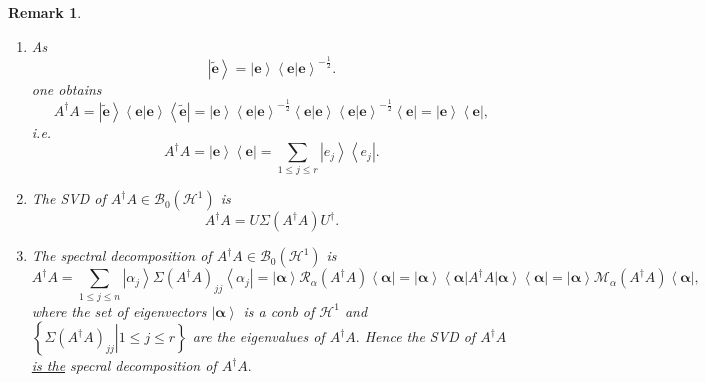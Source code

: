 \documentclass[aps,preprint]{revtex4}%
\newtheorem{remark}[theorem]{Remark}
\begin{document}
\begin{remark}
\begin{enumerate}
\begin{enumerate}
\item As%
\begin{equation}
\left\vert \widetilde{\mathbf{e}}\right\rangle =\left\vert \mathbf{e}%
\right\rangle \left\langle \left.  \mathbf{e}\right\vert \mathbf{e}%
\right\rangle ^{-\frac{1}{2}}.
\end{equation}
one obtains
\begin{equation}
A^{\dagger}A=\left\vert \widetilde{\mathbf{e}}\right\rangle \left\langle
\left.  \mathbf{e}\right\vert \mathbf{e}\right\rangle \left\langle
\widetilde{\mathbf{e}}\right\vert =\left\vert \mathbf{e}\right\rangle
\left\langle \left.  \mathbf{e}\right\vert \mathbf{e}\right\rangle ^{-\frac
{1}{2}}\left\langle \left.  \mathbf{e}\right\vert \mathbf{e}\right\rangle
\left\langle \left.  \mathbf{e}\right\vert \mathbf{e}\right\rangle ^{-\frac
{1}{2}}\left\langle \mathbf{e}\right\vert =\left\vert \mathbf{e}\right\rangle
\left\langle \mathbf{e}\right\vert ,
\end{equation}
i.e.
\begin{equation}
A^{\dagger}A=\left\vert \mathbf{e}\right\rangle \left\langle \mathbf{e}%
\right\vert =\sum_{1\leq j\leq r}\left\vert e_{j}\right\rangle \left\langle
e_{j}\right\vert .
\end{equation}


\item The SVD of $A^{\dagger}A\in\mathcal{B}_{0}\left(  \mathcal{H}%
^{1}\right)  $ is
\begin{equation}
A^{\dagger}A=U\Sigma\left(  A^{\dagger}A\right)  U^{\dagger}.
\end{equation}


\item The \emph{spectral} decomposition of $A^{\dagger}A\in\mathcal{B}%
_{0}\left(  \mathcal{H}^{1}\right)  $ is%
\begin{equation}
A^{\dagger}A=\sum_{1\leq j\leq n}\left\vert \alpha_{j}\right\rangle
\Sigma\left(  A^{\dagger}A\right)  _{jj}\left\langle \alpha_{j}\right\vert
=\left\vert \mathbf{\alpha}\right\rangle \mathcal{R}_{\alpha}\left(
A^{\dagger}A\right)  \left\langle \mathbf{\alpha}\right\vert =\left\vert
\mathbf{\alpha}\right\rangle \left\langle \mathbf{\alpha}\right\vert
A^{\dagger}A\left\vert \mathbf{\alpha}\right\rangle \left\langle
\mathbf{\alpha}\right\vert =\left\vert \mathbf{\alpha}\right\rangle
\mathcal{M}_{\alpha}\left(  A^{\dagger}A\right)  \left\langle \mathbf{\alpha
}\right\vert ,
\end{equation}
where the set of eigenvectors $\left\vert \mathbf{\alpha}\right\rangle $ is a
conb of $\mathcal{H}^{1}$ and $\left\{  \left.  \Sigma\left(  A^{\dagger
}A\right)  _{jj}\right\vert 1\leq j\leq r\right\}  $ are the eigenvalues of
$A^{\dagger}A.$ Hence the SVD of $A^{\dagger}A$ \underline{\emph{is the}}
specral decomposition of $A^{\dagger}A.$


\end{enumerate}
\end{enumerate}
\end{remark}
\end{document}
